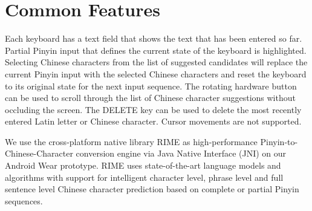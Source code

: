 \section{Common Features}
Each keyboard has a text field that shows the text that has been entered so far. Partial Pinyin input that defines the current state of the keyboard is highlighted. Selecting Chinese characters from the list of suggested candidates will replace the current Pinyin input with the selected Chinese characters and reset the keyboard to its original state for the next input sequence. The rotating hardware button can be used to scroll through the list of Chinese character suggestions without occluding the screen. The DELETE key can be used to delete the most recently entered Latin letter or Chinese character. Cursor movements are not supported.

We use the cross-platform native library RIME \cite{rime} as high-performance Pinyin-to-Chinese-Character conversion engine via Java Native Interface (JNI) on our Android Wear prototype. RIME uses state-of-the-art language models and algorithms with support for intelligent character level, phrase level and full sentence level Chinese character prediction based on complete or partial Pinyin sequences.
